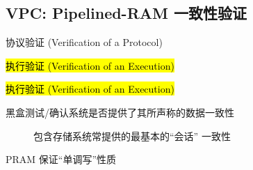 
\subsection{VPC: Pipelined-RAM 一致性验证}

\newcommand{\pram}{Pipelined-RAM}
\newcommand{\PRAM}{PRAM}
\newcommand{\vpc}[1]{\ifthenelse{\isempty{#1}{}}{\textsf{VPC}}{\textsf{VPC-\MakeUppercase{#1}}}} 
\newcommand{\npc}{$\sf{NP}$-complete}
\newcommand{\npcn}{$\sf{NP}$-completeness}
\newcommand{\rwclosure}{\textsc{RW-Closure}}
\newcommand{\readcentric}{\textsc{Read-Centric}}

\begin{frame}{}

  \pause
  \begin{center}
    \vspace{0.50cm}
    协议验证 (Verification of a Protocol)

    \vspace{0.30cm}
    \hl{执行验证 (Verification of an Execution)}
  \end{center}
\end{frame}

\begin{frame}{}
  \begin{center}
    \hl{执行验证 (Verification of an Execution)}
    \vspace{0.50cm}

    
    \vspace{0.30cm}
    {黑盒测试/确认系统是否提供了其所声称的数据一致性}

     
  \end{center}
\end{frame}

\begin{frame}{}
  \begin{description}
    \item[] 包含存储系统常提供的最基本的``会话''  一致性

	 
  \end{description}

  \vspace{-0.10cm}
  {\centerline{\PRAM{} 保证``单调写''性质}}
\end{frame}

